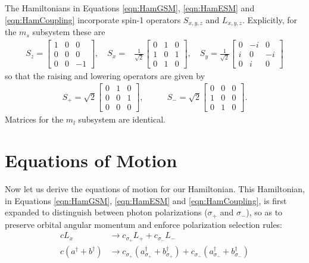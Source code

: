 \documentclass[aps,pra,amsmath,amssymb,reprint,superscriptaddress,tightenlines]{revtex4-1}
\begin{document}
The Hamiltonians in Equations \ref{eqn:HamGSM}, \ref{eqn:HamESM} and \ref{eqn:HamCoupling} incorporate spin-1 operators $S_{x,y,z}$ and $L_{x,y,z}$. Explicitly, for the $m_{s}$ subsystem these are
\begin{align}
	S_{z} = \left[ \begin{smallmatrix} 1&0&0\\ 0&0&0\\ 0&0&-1 \end{smallmatrix} \right] , \quad S_{x} =& \frac{1}{\sqrt{2}} \left[ \begin{smallmatrix} 0&1&0\\ 1&0&1\\ 0&1&0 \end{smallmatrix} \right], \quad S_{y} = \frac{1}{\sqrt{2}} \left[ \begin{smallmatrix} 0&-i&0\\ i&0&-i\\ 0&i&0 \end{smallmatrix} \right]
\end{align}
so that the raising and lowering operators are given by
\begin{align}
	S_{+} = \sqrt{2} \left[ \begin{smallmatrix} 0&1&0\\ 0&0&1\\ 0&0&0 \end{smallmatrix} \right] , & \qquad S_{-} = \sqrt{2} \left[ \begin{smallmatrix} 0&0&0\\ 1&0&0\\ 0&1&0 \end{smallmatrix} \right] .
\end{align}
Matrices for the $m_{l}$ subsystem are identical.


\section{Equations of Motion}

Now let us derive the equations of motion for our Hamiltonian. This Hamiltonian, in Equations \ref{eqn:HamGSM}, \ref{eqn:HamESM} and \ref{eqn:HamCoupling}, is first expanded to distinguish between photon polarizations ($\sigma_{+}$ and $\sigma_{-}$), so as to preserve orbital angular momentum and enforce polarization selection rules:
\begin{align}
	c L_{x} &\rightarrow c_{\sigma_{+}} L_{+} + c_{\sigma_{-}} L_{-}\\
	c \left( a^{\dagger} + b^{\dagger} \right) &\rightarrow c_{\sigma_{+}} \left( a^{\dagger}_{\sigma_{+}} + b^{\dagger}_{\sigma_{+}} \right) + c_{\sigma_{-}} \left( a^{\dagger}_{\sigma_{-}} + b^{\dagger}_{\sigma_{-}} \right)
\end{align}
\end{document}

